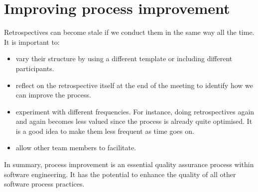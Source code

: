 \documentclass[a4paper, openany]{memoir}
\begin{document}
\section{Improving process improvement}
Retrospectives can become stale if we conduct them in the same way all the time. It is important to:
\begin{itemize}
    \item vary their structure by using a different template or including different participants.
    \item reflect on the retrospective itself at the end of the meeting to identify how we can improve the process.
    \item experiment with different frequencies. For instance, doing retrospectives again and again becomes less valued since the process is already quite optimised. It is a good idea to make them less frequent as time goes on.
    \item allow other team members to facilitate.
\end{itemize}

In summary, process improvement is an essential quality assurance process within software engineering. It has the potential to enhance the quality of all other software process practices.
\end{document}
